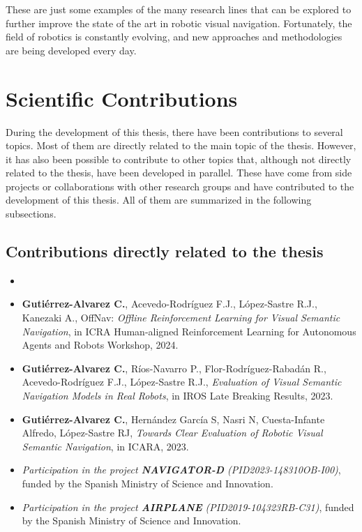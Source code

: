 These are just some examples of the many research lines that can be explored to further improve the state of the art in robotic visual navigation.
Fortunately, the field of robotics is constantly evolving, and new approaches and methodologies are being developed every day.

\section{Scientific Contributions}\label{sec:final-remarks}

During the development of this thesis, there have been contributions to several topics.
Most of them are directly related to the main topic of the thesis.
However, it has also been possible to contribute to other topics that, although not directly related to the thesis, have been developed in parallel.
These have come from side projects or collaborations with other research groups and have contributed to the development of this thesis.
All of them are summarized in the following subsections.

\subsection{Contributions directly related to the thesis}\label{subsec:contributions-directly-related-to-the-thesis}

\begin{itemize}
    \item {}
    \item \textbf{Gutiérrez-Alvarez C.}, Acevedo-Rodríguez F.J., López-Sastre R.J., Kanezaki A., OffNav: \textit{Offline Reinforcement Learning for Visual Semantic Navigation}, in ICRA Human-aligned Reinforcement Learning for Autonomous Agents and Robots Workshop, 2024.
    \item \textbf{Gutiérrez-Alvarez C.}, Ríos-Navarro P., Flor-Rodríguez-Rabadán R., Acevedo-Rodríguez F.J., López-Sastre R.J., \textit{Evaluation of Visual Semantic Navigation Models in Real Robots}, in IROS Late Breaking Results, 2023.
    \item \textbf{Gutiérrez-Alvarez C.}, Hernández García S, Nasri N, Cuesta-Infante Alfredo, López-Sastre RJ, \textit{Towards Clear Evaluation of Robotic Visual Semantic Navigation}, in ICARA, 2023.
    \item \textit{Participation in the project \textbf{NAVIGATOR-D} (PID2023-148310OB-I00)}, funded by the Spanish Ministry of Science and Innovation.
    \item \textit{Participation in the project \textbf{AIRPLANE} (PID2019-104323RB-C31)}, funded by the Spanish Ministry of Science and Innovation.
\end{itemize}

